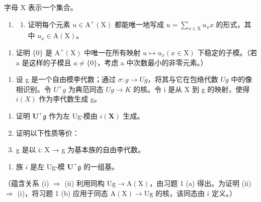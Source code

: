 
字母 X 表示一个集合。

\begin{enumerate}
\def\labelenumi{\arabic{enumi}.}
\tightlist
\item
  \begin{enumerate}
  \def\labelenumii{(\alph{enumii})}
  \tightlist
  \item
    证明每个元素 \(u \in \mathrm{A}^{+}(\mathrm{X})\) 都能唯一地写成 \(u = \sum_{x \in \mathrm{X}} u_{x} x\) 的形式，其中 \(u_{x} \in \mathrm{A}(\mathrm{X})\)。
  \end{enumerate}
\end{enumerate}

\begin{enumerate}
\def\labelenumi{(\alph{enumi})}
\setcounter{enumi}{1}
\tightlist
\item
  证明 \(\{0\}\) 是 \(\mathrm{A}^{+}(\mathrm{X})\) 中唯一在所有映射 \(u \mapsto u_{x} (x \in \mathrm{X})\) 下稳定的子模。（若 a 是这样的子模且 \(a \neq \{0\}\)，考虑 a 中次数最小的非零元素。）
\end{enumerate}

\begin{enumerate}
\def\labelenumi{\arabic{enumi}.}
\setcounter{enumi}{1}
\tightlist
\item
  设 g 是一个自由模李代数；通过 \(\sigma: g \to Ug\)，将其与它在包络代数 \(Ug\) 中的像相识别。令 \(U^{+}g\) 为典范同态 \(Ug \to K\) 的核。令 i 是从 X 到 g 的映射，使得 \(i(X)\) 作为李代数生成 g。
\end{enumerate}

\begin{enumerate}
\def\labelenumi{(\alph{enumi})}
\item
  证明 \(\mathbf{U}^{+}\mathfrak{g}\) 作为左 Ug-模由 \(i(\mathbf{X})\) 生成。
\item
  证明以下性质等价：
\item
  g 是以 i: X → g 为基本族的自由李代数。
\end{enumerate}

\begin{enumerate}
\def\labelenumi{(\roman{enumi})}
\setcounter{enumi}{1}
\tightlist
\item
  族 \(i\) 是左 Ug-模 \(\mathbf{U}^{+}\mathfrak{g}\) 的一组基。
\end{enumerate}

（蕴含关系 (i) \(\Rightarrow\) (ii) 利用同构 \(\mathrm{Ug} \to \mathrm{A}(\mathrm{X})\)，由习题 1 (a) 得出。为证明 (ii) \(\Rightarrow\) (i)，将习题 1 (b) 应用于同态 \(\mathrm{A}(\mathrm{X}) \to \mathrm{Ug}\) 的核，该同态由 \(i\) 定义。）

